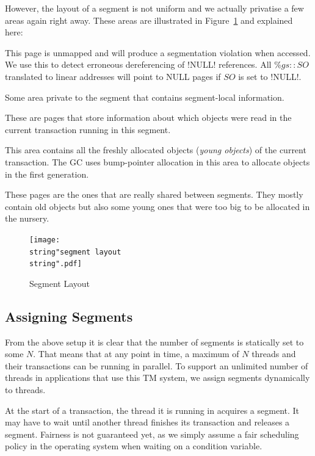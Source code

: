 \documentclass{sigplanconf}
\makeatletter
\renewcommand\lstinline[1][]{%
  \Collectverb{\@@myverb}%
}
\def\@@myverb#1{%
    \begingroup
    \fboxsep=0.2em
    \colorbox{verylightgray}{\oldlstinline|#1|}%
    \endgroup
}
\makeatother
\begin{document}
However, the layout of a segment is not uniform and we actually
privatise a few areas again right away. These areas are illustrated in
Figure~\ref{fig:Segment-Layout} and explained here:
\begin{description}[noitemsep]
\item [{NULL~page:}] This page is unmapped and will produce a
  segmentation violation when accessed. We use this to detect
  erroneous dereferencing of \lstinline!NULL! references.  All
  $\%gs{::}SO$ translated to linear addresses will point to NULL pages
  if $SO$ is set to \lstinline!NULL!.
\item [{Segment-local~data:}] Some area private to the segment that
  contains segment-local information.
\item [{Read~markers:}] These are pages that store information about
  which objects were read in the current transaction running in this
  segment.
\item [{Nursery:}] This area contains all the freshly allocated
  objects (\emph{young objects}) of the current transaction. The GC
  uses bump-pointer allocation in this area to allocate objects in the
  first generation.
\item [{Old~object~space:}] These pages are the ones that are really
  shared between segments. They mostly contain old objects but also
  some young ones that were too big to be allocated in the nursery.
\end{description}



\begin{figure}[t]
  \centering
  \texttt{[image: \\string"segment layout\\string".pdf]}
  \caption{Segment Layout\label{fig:Segment-Layout}}
\end{figure}



\subsection{Assigning Segments}

From the above setup it is clear that the number of segments is
statically set to some $N$. That means that at any point in time, a
maximum of $N$ threads and their transactions can be running in
parallel.  To support an unlimited number of threads in applications
that use this TM system, we assign segments dynamically to threads.

At the start of a transaction, the thread it is running in acquires a
segment. It may have to wait until another thread finishes its
transaction and releases a segment. Fairness is not guaranteed yet, as
we simply assume a fair scheduling policy in the operating system when
waiting on a condition variable.
\end{document}
